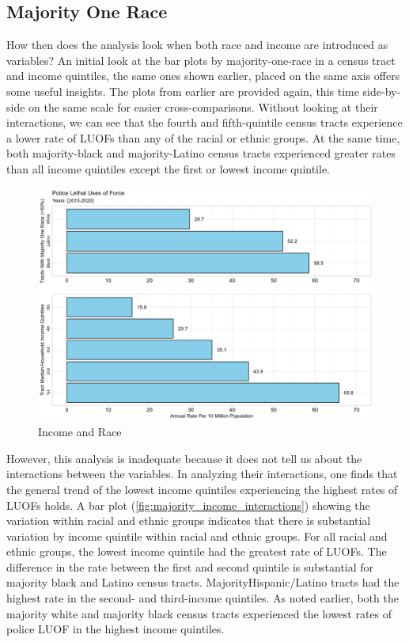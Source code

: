 \documentclass[12pt]{article}
\begin{document}
\subsection{Majority One Race}

How then does the analysis look when both race and income are introduced as variables? An initial look at the bar plots by majority-one-race in a census tract and income quintiles, the same ones shown earlier, placed on the same axis offers some useful insights. The plots from earlier are provided again, this time side-by-side on the same scale for easier cross-comparisons. Without looking at their interactions, we can see that the fourth and fifth-quintile census tracts experience a lower rate of LUOFs than any of the racial or ethnic groups. At the same time, both majority-black and majority-Latino census tracts experienced greater rates than all income quintiles except the first or lowest income quintile.

\begin{figure}[H]
  \centering %
  \includegraphics[width=\linewidth]{images/combined}
  \captionsetup{justification=centering, singlelinecheck=false, margin=2cm}
  \caption[Income and Race]{Income and Race}
  \label{fig:combined}
\end{figure}

However, this analysis is inadequate because it does not tell us about the interactions between the variables. In analyzing their interactions, one finds that the general trend of the lowest income quintiles experiencing the highest rates of LUOFs holds. A bar plot (\autoref{fig:majority_income_interactions}) showing the variation within racial and ethnic groups indicates that there is substantial variation by income quintile within racial and ethnic groups. For all racial and ethnic groups, the lowest income quintile had the greatest rate of LUOFs. The difference in the rate between the first and second quintile is substantial for majority black and Latino census tracts. MajorityHispanic/Latino tracts had the highest rate in the second- and third-income quintiles. As noted earlier, both the majority white and majority black census tracts experienced the lowest rates of police LUOF in the highest income quintiles.
\end{document}

